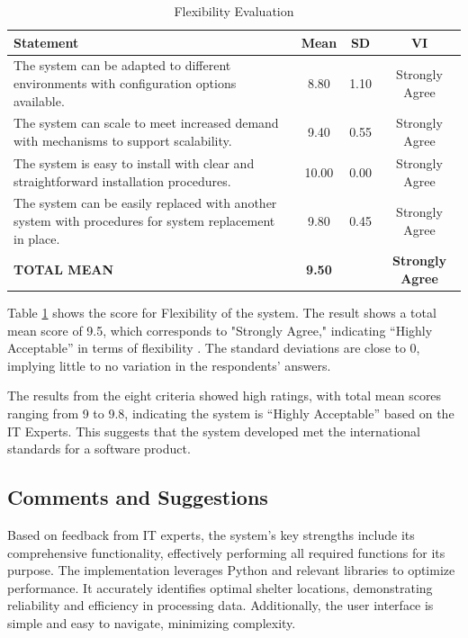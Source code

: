 	\begin{table}[h!]
		\centering
		\caption{Flexibility Evaluation}
		\label{flxblty}
		\renewcommand{\arraystretch}{1.2}
		\begin{tabularx}{\linewidth}{|X|c|c|c|}
			\hline
			\textbf{Statement} & \textbf{Mean} & \textbf{SD} & \textbf{VI} \\ \hline
			The system can be adapted to different environments with configuration options available.
			& 8.80 & 1.10 & Strongly Agree \\ \hline
			The system can scale to meet increased demand with mechanisms to support scalability.
			& 9.40 & 0.55 & Strongly Agree \\ \hline
			The system is easy to install with clear and straightforward installation procedures.
			& 10.00 & 0.00 & Strongly Agree \\ \hline
			The system can be easily replaced with another system with procedures for system replacement in place.
			& 9.80 & 0.45 & Strongly Agree \\ \hline
			\textbf{TOTAL MEAN} & \textbf{9.50} & & \textbf{Strongly Agree} \\ \hline
		\end{tabularx}
	\end{table}
	
	Table \ref{flxblty} shows the score for Flexibility of the system. The result shows a total mean score of 9.5, which corresponds to "Strongly Agree," indicating “Highly Acceptable” in terms of flexibility . The standard deviations are close to 0, implying little to no variation in the respondents’ answers.
	
	The results from the eight criteria showed high ratings, with total mean scores ranging from 9 to 9.8, indicating the system is “Highly Acceptable” based on the IT Experts. This suggests that the system developed met the international standards for a software product.

\subsection{Comments and Suggestions}
	Based on feedback from IT experts, the system's key strengths include its comprehensive functionality, effectively performing all required functions for its purpose. The implementation leverages Python and relevant libraries to optimize performance. It accurately identifies optimal shelter locations, demonstrating reliability and efficiency in processing data. Additionally, the user interface is simple and easy to navigate, minimizing complexity.
	
